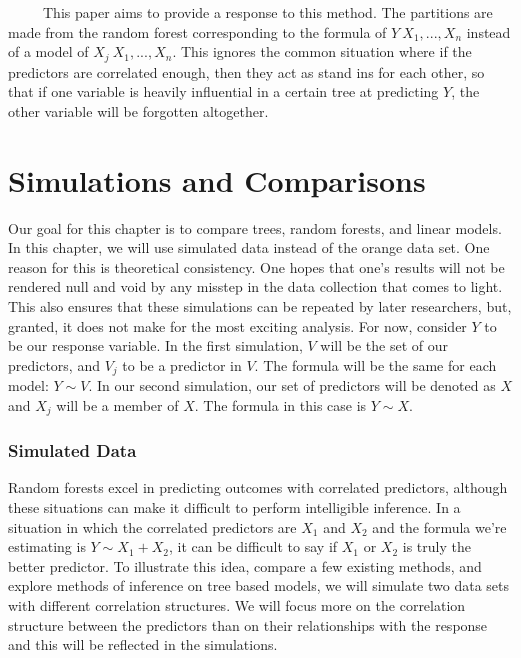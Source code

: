 \documentclass[12pt,twoside]{reedthesis}
\begin{document}
  ~~~~~This paper aims to provide a response to this method. The
  partitions are made from the random forest corresponding to the formula
  of \(Y~X_1,...,X_n\) instead of a model of \(X_j~X_1,...,X_n\). This
  ignores the common situation where if the predictors are correlated
  enough, then they act as stand ins for each other, so that if one
  variable is heavily influential in a certain tree at predicting \(Y\),
  the other variable will be forgotten altogether.
  
  \chapter{Simulations and Comparisons}\label{simulations-and-comparisons}
  
  Our goal for this chapter is to compare trees, random forests, and
  linear models. In this chapter, we will use simulated data instead of
  the orange data set. One reason for this is theoretical consistency. One
  hopes that one's results will not be rendered null and void by any
  misstep in the data collection that comes to light. This also ensures
  that these simulations can be repeated by later researchers, but,
  granted, it does not make for the most exciting analysis. For now,
  consider \(Y\) to be our response variable. In the first simulation,
  \(V\) will be the set of our predictors, and \(V_j\) to be a predictor
  in \(V\). The formula will be the same for each model: \(Y \sim V\). In
  our second simulation, our set of predictors will be denoted as \(X\)
  and \(X_j\) will be a member of \(X\). The formula in this case is
  \(Y \sim X\).
  
  \subsection{Simulated Data}\label{simulated-data}
  
  Random forests excel in predicting outcomes with correlated predictors,
  although these situations can make it difficult to perform intelligible
  inference. In a situation in which the correlated predictors are \(X_1\)
  and \(X_2\) and the formula we're estimating is \(Y \sim X_1 + X_2\), it
  can be difficult to say if \(X_1\) or \(X_2\) is truly the better
  predictor. To illustrate this idea, compare a few existing methods, and
  explore methods of inference on tree based models, we will simulate two
  data sets with different correlation structures. We will focus more on
  the correlation structure between the predictors than on their
  relationships with the response and this will be reflected in the
  simulations.
  
\end{document}
